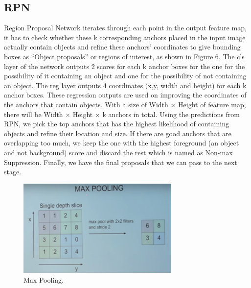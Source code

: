 \documentclass{ndjflart}
\theoremstyle{definition}
\theoremstyle{remark}
\begin{document}
\subsection{RPN}\label{ssecnotes}
Region Proposal Network iterates through each point in the output feature map, it has to check whether these k corresponding anchors placed in the input image actually contain objects and refine these anchors’ coordinates to give bounding boxes as “Object proposals” or regions of interest, as shown in Figure 6. The cls layer of the network outputs 2 scores for each k anchor boxes for the one for the possibility of it containing an object and one for the possibility of not containing an object.
The reg layer outputs 4 coordinates (x,y, width and height) for each k anchor boxes. These regression outputs are used on improving the coordinates of the anchors that contain objects.
With a size of Width × Height of feature map, there will be Width × Height × k anchors in total.
Using the predictions from RPN, we pick the top anchors that has the highest likelihood of containing objects and refine their location and size. If there are good anchors that are overlapping too much, we keep the one with the highest foreground (an object and not background) score and discard the rest which is named as Non-max Suppression. Finally, we have the final proposals that we can pass to the next stage.

\begin{figure}
\begin{center}
\vspace{0.5em}
    \includegraphics[width=8cm]{images/maxpooling}
    \vspace{-.5em}
\caption{Max Pooling. }
\label{fig:framework}
    \end{center}
\end{figure}
\end{document}
